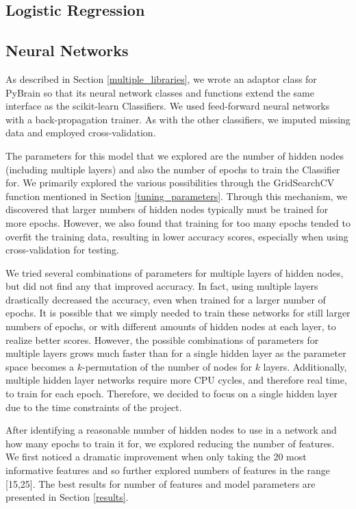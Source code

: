 \documentclass{article}
\begin{document}
\subsection{Logistic Regression}

\subsection{Neural Networks}

As described in Section \ref{multiple_libraries}, we wrote an adaptor class for PyBrain so that its neural network classes and functions extend the same interface as the scikit-learn Classifiers.
We used feed-forward neural networks with a back-propagation trainer.
As with the other classifiers, we imputed missing data and employed cross-validation.

The parameters for this model that we explored are the number of hidden nodes (including multiple layers) and also the number of epochs to train the Classifier for.
We primarily explored the various possibilities through the GridSearchCV function mentioned in Section \ref{tuning_parameters}.
Through this mechanism, we discovered that larger numbers of hidden nodes typically must be trained for more epochs.
However, we also found that training for too many epochs tended to overfit the training data, resulting in lower accuracy scores, especially when using cross-validation for testing.

We tried several combinations of parameters for multiple layers of hidden nodes, but did not find any that improved accuracy.
In fact, using multiple layers drastically decreased the accuracy, even when trained for a larger number of epochs.
It is possible that we simply needed to train these networks for still larger numbers of epochs, or with different amounts of hidden nodes at each layer, to realize better scores.
However, the possible combinations of parameters for multiple layers grows much faster than for a single hidden layer as the parameter space becomes a $k$-permutation of the number of nodes for $k$ layers.
Additionally, multiple hidden layer networks require more CPU cycles, and therefore real time, to train for each epoch.
Therefore, we decided to focus on a single hidden layer due to the time constraints of the project.

After identifying a reasonable number of hidden nodes to use in a network and how many epochs to train it for, we explored reducing the number of features.
We first noticed a dramatic improvement when only taking the 20 most informative features and so further explored numbers of features in the range [15,25].
The best results for number of features and model parameters are presented in Section \ref{results}.
\end{document}
